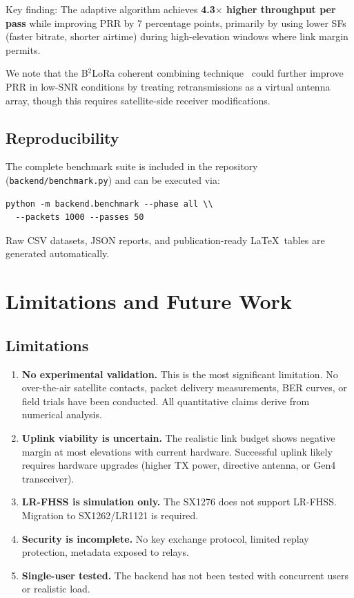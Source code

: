 \documentclass[11pt,a4paper]{article}
\begin{document}
Key finding: The adaptive algorithm achieves \textbf{4.3$\times$ higher throughput per pass} while improving PRR by 7 percentage points, primarily by using lower SFs (faster bitrate, shorter airtime) during high-elevation windows where link margin permits.

We note that the B$^2$LoRa coherent combining technique~\cite{b2lora2025} could further improve PRR in low-SNR conditions by treating retransmissions as a virtual antenna array, though this requires satellite-side receiver modifications.

\subsection{Reproducibility}

The complete benchmark suite is included in the repository (\texttt{backend/benchmark.py}) and can be executed via:

\begin{verbatim}
python -m backend.benchmark --phase all \\
  --packets 1000 --passes 50
\end{verbatim}

Raw CSV datasets, JSON reports, and publication-ready \LaTeX\ tables are generated automatically.

\section{Limitations and Future Work}
\label{sec:limitations}

\subsection{Limitations}

\begin{enumerate}
    \item \textbf{No experimental validation.} This is the most significant limitation. No over-the-air satellite contacts, packet delivery measurements, BER curves, or field trials have been conducted. All quantitative claims derive from numerical analysis.
    
    \item \textbf{Uplink viability is uncertain.} The realistic link budget shows negative margin at most elevations with current hardware. Successful uplink likely requires hardware upgrades (higher TX power, directive antenna, or Gen4 transceiver).
    
    \item \textbf{LR-FHSS is simulation only.} The SX1276 does not support LR-FHSS. Migration to SX1262/LR1121 is required.
    
    \item \textbf{Security is incomplete.} No key exchange protocol, limited replay protection, metadata exposed to relays.
    
    \item \textbf{Single-user tested.} The backend has not been tested with concurrent users or realistic load.
\end{enumerate}
\end{document}
